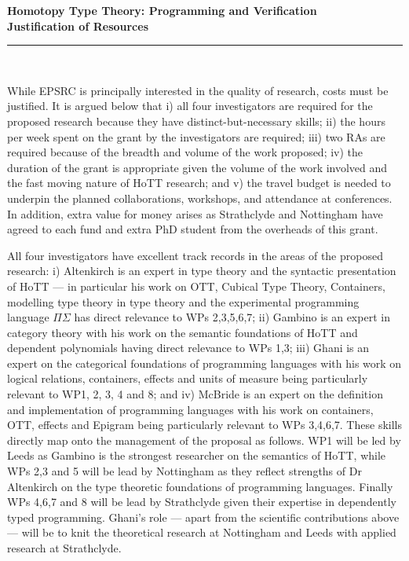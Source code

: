 \documentclass[a4paper,11pt]{article}
\begin{document}
\thispagestyle{plain}
\begin{center}
  {\Large \bf Homotopy Type Theory: Programming and Verification\\
\vspace{0.2in}
  Justification of Resources}\\[1ex]

\vspace*{-0.1in}

\rule{160mm}{.5mm}\\[2ex]
\end{center}

\noindent While EPSRC is principally interested in the quality of
research, costs must be justified. It is argued below that i) all four
investigators are required for the proposed research because they have
distinct-but-necessary skills; ii) the hours per week spent on
the grant by the investigators are required; iii)  two RAs are required because of the
breadth and volume of the work proposed; iv) the duration of the
grant is appropriate given the volume of the work involved and the
fast moving nature of HoTT research; and v) the travel budget
is needed to underpin the planned collaborations, workshops, and
attendance at conferences. In addition, extra value for money arises
as Strathclyde and Nottingham have agreed to
each fund and extra PhD student from the overheads of this grant.

\vspace{0.02in}

 All four investigators have
excellent track records in the areas of the proposed research: i)
Altenkirch is an expert in type theory and the syntactic presentation
of HoTT --- in particular his work on OTT, Cubical Type Theory,
Containers, modelling type theory in type theory and the experimental
programming language $\Pi\Sigma$ has direct relevance to WPs
2,3,5,6,7; ii) Gambino is an expert in category theory with his work
on the semantic foundations of HoTT and dependent polynomials having
direct relevance to WPs 1,3; iii) Ghani is an expert on the
categorical foundations of programming languages with his work on
logical relations, containers, effects and units of measure being
particularly relevant to WP1, 2, 3, 4 and 8; and iv) McBride is an
expert on the definition and implementation of programming languages
with his work on containers, OTT, effects and Epigram being
particularly relevant to WPs 3,4,6,7. These skills directly map onto
the management of the proposal as follows. WP1 will be led
by Leeds as Gambino is the strongest researcher on the semantics of
HoTT, while WPs 2,3 and 5 will be lead by Nottingham as they reflect
strengths of Dr Altenkirch on the type theoretic foundations of
programming languages. Finally WPs 4,6,7 and 8 will be lead by
Strathclyde given their expertise in dependently typed
programming. Ghani's role --- apart from the scientific
contributions above --- will be to knit the theoretical
research at Nottingham and Leeds with applied
research at Strathclyde.
\end{document}
